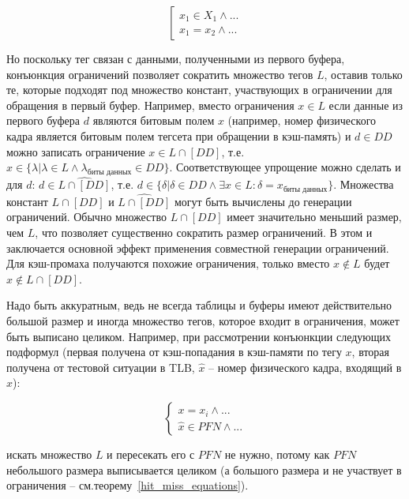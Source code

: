 $$
\left[\begin{array}{l} x_1 \in X_1 \wedge \mbox{...}\\
x_1 = x_2 \wedge \mbox{...}
\end{array}\right.
$$

Но поскольку тег связан с данными, полученными из первого буфера,
конъюнкция ограничений позволяет сократить множество тегов $L$,
оставив только те, которые подходят под множество констант,
участвующих в ограничении для обращения в первый буфер. Например,
вместо ограничения $x \in L$ если данные из первого буфера $d$
являются битовым полем $x$ (например, номер физического кадра
является битовым полем тегсета при обращении в кэш-память) и $d \in
DD$ можно записать ограничение $x \in L \cap [DD]$, т.е. $x \in
\{\lambda | \lambda \in L \wedge \lambda_{\mbox{биты данных}} \in
DD\}$. Соответствующее упрощение можно сделать и для $d$: $d \in
\widehat{L \cap [DD]}$, т.е. $d \in \{\delta | \delta \in DD \wedge
\exists x \in L : \delta = x_{\mbox{биты данных}}\}$. Множества
констант $L \cap [DD]$ и $\widehat{L \cap [DD]}$ могут быть
вычислены до генерации ограничений. Обычно множество $L \cap [DD]$
имеет значительно меньший размер, чем $L$, что позволяет существенно
сократить размер ограничений. В этом и заключается основной эффект
применения совместной генерации ограничений. Для кэш-промаха
получаются похожие ограничения, только вместо $x \notin L$ будет $x
\notin L \cap [DD]$.

Надо быть аккуратным, ведь не всегда таблицы и буферы имеют
действительно большой размер и иногда множество тегов, которое
входит в ограничения, может быть выписано целиком. Например, при
рассмотрении конъюнкции следующих подформул (первая получена от
кэш-попадания в кэш-памяти по тегу $x$, вторая получена от тестовой
ситуации в TLB, $\hat{x}$ -- номер физического кадра, входящий в
$x$):

$$
\left\{\begin{array}{l} x = x_i \wedge \mbox{...}\\
\hat{x} \in PFN \wedge \mbox{...}
\end{array}\right.
$$

искать множество $L$ и пересекать его с $PFN$ не нужно, потому как
$PFN$ небольшого размера выписывается целиком (а большого размера и
не участвует в ограничения -- см.теорему~\ref{hit_miss_equations}).



